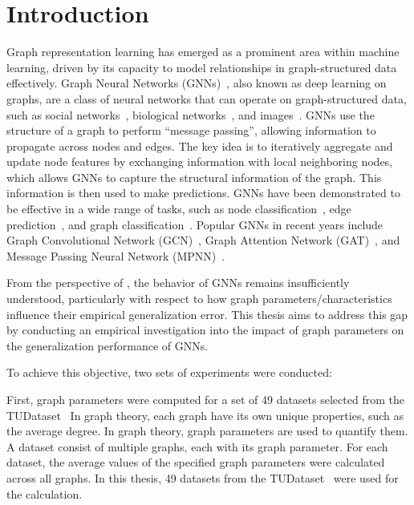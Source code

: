 \chapter{Introduction}\label{chap:introduction}
Graph representation learning has emerged as a prominent area within machine learning, driven by its capacity to model relationships in graph-structured data effectively. Graph Neural Networks (GNNs)~\cite{gori2005new}, also known as deep learning on graphs, are a class of neural networks that can operate on graph-structured data, such as social networks~\cite{easley2010networks}, biological networks~\cite{barabasi2004network}, and images~\cite{simonovsky2017dynamic}. GNNs use the structure of a graph to perform ``message passing'', allowing information to propagate across nodes and edges. The key idea is to iteratively aggregate and update node features by exchanging information with local neighboring nodes, which allows GNNs to capture the structural information of the graph. This information is then used to make predictions. GNNs have been demonstrated to be effective in a wide range of tasks, such as node classification~\cite{hamilton2017inductive}, edge prediction~\cite{kipf2016variational}, and graph classification~\cite{gilmer2017neural}. Popular GNNs in recent years include Graph Convolutional Network (GCN)~\cite{kipf2016semi}, Graph Attention Network (GAT)~\cite{velickovic2020pointer}, and Message Passing Neural Network (MPNN)~\cite{gilmer2017neural}.  

From the perspective of \cite{morris2024futuredirectionstheorygraph}, the behavior of GNNs remains insufficiently understood, particularly with respect to how graph parameters/characteristics influence their empirical generalization error. This thesis aims to address this gap by conducting an empirical investigation into the impact of graph parameters on the generalization performance of GNNs.

To achieve this objective, two sets of experiments were conducted:

First, graph parameters were computed for a set of 49 datasets selected from the TUDataset~\cite{morris2020tudataset} In graph theory, each graph have its own unique properties, such as the average degree. In graph theory, graph parameters are used to quantify them. A dataset consist of multiple graphs, each with its graph parameter. For each dataset, the average values of the specified graph parameters were calculated across all graphs. In this thesis, 49 datasets from the TUDataset~\cite{morris2020tudataset} were used for the calculation.

